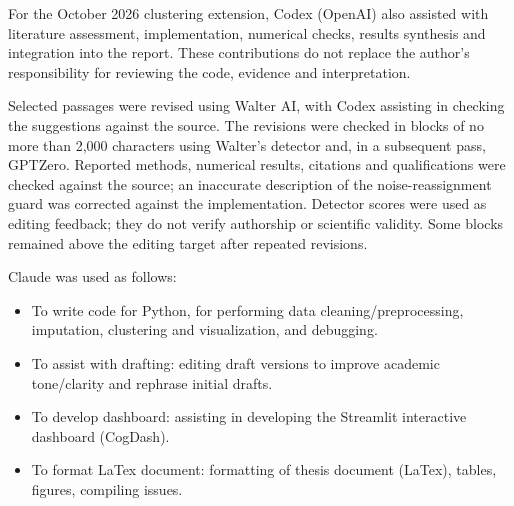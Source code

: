 \documentclass[
11pt, %
english, %
onehalfspacing, %
headsepline, %
]{MastersDoctoralThesis} %
\begin{document}
For the October 2026 clustering extension, Codex (OpenAI) also assisted with literature assessment, implementation, numerical checks, results synthesis and integration into the report. These contributions do not replace the author's responsibility for reviewing the code, evidence and interpretation.

Selected passages were revised using Walter AI, with Codex assisting in checking the suggestions against the source. The revisions were checked in blocks of no more than 2,000 characters using Walter's detector and, in a subsequent pass, GPTZero. Reported methods, numerical results, citations and qualifications were checked against the source; an inaccurate description of the noise-reassignment guard was corrected against the implementation. Detector scores were used as editing feedback; they do not verify authorship or scientific validity. Some blocks remained above the editing target after repeated revisions.



Claude was used as follows:



\begin{itemize}

    \item To write code for Python, for performing data cleaning/preprocessing, imputation, clustering and visualization, and debugging.

\end{itemize}



\begin{itemize}

    \item To assist with drafting: editing draft versions to improve academic tone/clarity and rephrase initial drafts.

\end{itemize}



\begin{itemize}

    \item To develop dashboard: assisting in developing the Streamlit interactive dashboard (CogDash).

\end{itemize}



\begin{itemize}

    \item To format LaTex document: formatting of thesis document (LaTex), tables, figures, compiling issues.

\end{itemize}
\end{document}
